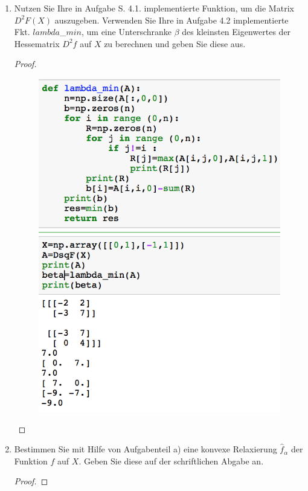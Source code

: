 \documentclass[12pt]{extreport} %
\begin{document}
\begin{enumerate}
	\item Nutzen Sie Ihre in Aufgabe S. 4.1. implementierte Funktion, um die Matrix $D^2 F(X)$ auszugeben. Verwenden Sie Ihre in Aufgabe 4.2 implementierte Fkt. $lambda$_$min$, um eine Unterschranke $\beta$ des kleinsten Eigenwertes der Hessematrix $D^2 f$ auf $X$ zu berechnen und geben Sie diese aus.
		\begin{proof} ~\\
			\begin{figure}[h!] \centering
				\includegraphics[scale=0.7]{img/su2iv-iii-1}
			\end{figure}
		\end{proof} \newpage
	\item Bestimmen Sie mit Hilfe von Aufgabenteil a) eine konvexe Relaxierung $\hat{f}_\alpha$ der Funktion $f$ auf $X$. Geben Sie diese auf der schriftlichen Abgabe an.
		\begin{proof}

\end{proof}
\end{enumerate}
\end{document}
